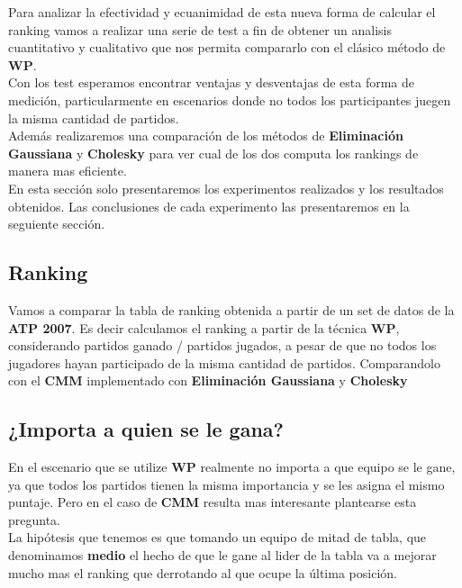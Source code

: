 Para analizar la efectividad y ecuanimidad de esta nueva forma de calcular el ranking vamos a realizar una serie de test a fin de obtener un analisis cuantitativo y cualitativo que nos permita compararlo con el clásico método de \textbf{WP}. \\
Con los test esperamos encontrar ventajas y desventajas de esta forma de medición, particularmente en escenarios donde no todos los participantes juegen la misma cantidad de partidos.
\\

Además realizaremos una comparación de los métodos de \textbf{Eliminación Gaussiana} y \textbf{Cholesky} para ver cual de los dos computa los rankings de manera mas eficiente.
\\

En esta sección solo presentaremos los experimentos realizados y los resultados obtenidos. Las conclusiones de cada experimento
las presentaremos en la seguiente sección. 


\subsection{Ranking}

Vamos a comparar la tabla de ranking obtenida a partir de un set de datos de la \textbf{ATP 2007}. Es decir calculamos el ranking a partir de la técnica \textbf{WP}, considerando partidos ganado / partidos jugados, a pesar de que no todos los jugadores hayan participado de la misma cantidad de partidos. Comparandolo con el \textbf{CMM} implementado con \textbf{Eliminación Gaussiana} y \textbf{Cholesky}



\subsection{¿Importa a quien se le gana?}


En el escenario que se utilize \textbf{WP} realmente no importa a que equipo se le gane, ya que todos los partidos tienen la misma importancia y se les asigna el mismo puntaje. Pero en el caso de \textbf{CMM} resulta mas interesante plantearse esta pregunta. \\

La hipótesis que tenemos es que tomando un equipo de mitad de tabla, que denominamos \textbf{medio} el hecho de que le gane al lider de la tabla va a mejorar mucho mas el ranking que derrotando al que ocupe la última posición. \\

